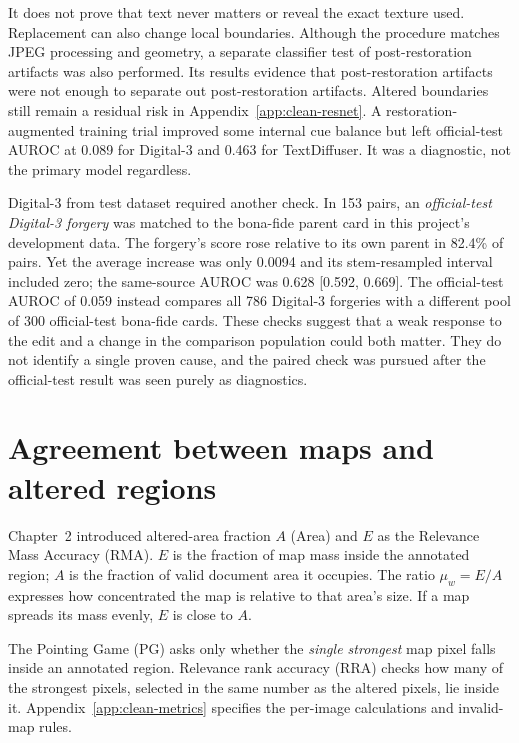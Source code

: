 It does not prove that text never matters or reveal the exact texture used. Replacement can also change local boundaries. Although the procedure matches JPEG processing and geometry, a separate classifier test of post-restoration artifacts was also performed. Its results evidence that post-restoration artifacts were not enough to separate out post-restoration artifacts.
Altered boundaries still remain a residual risk in Appendix~\ref{app:clean-resnet}. A restoration-augmented training trial improved some internal cue balance but left official-test AUROC at 0.089 for Digital-3 and 0.463 for TextDiffuser. It was a diagnostic, not the primary model regardless.

Digital-3 from test dataset required another check. In 153 pairs, an \emph{official-test Digital-3 forgery} was matched to the bona-fide parent card in this project's development data. The forgery's score rose relative to its own parent in 82.4\% of pairs. Yet the average increase was only 0.0094 and its stem-resampled interval included zero; the same-source AUROC was 0.628 [0.592, 0.669]. The official-test AUROC of 0.059 instead compares all 786 Digital-3 forgeries with a different pool of 300 official-test bona-fide cards. These checks suggest that a weak response to the edit and a change in the comparison population could both matter. They do not identify a single proven cause, and the paired check was pursued after the official-test result was seen purely as diagnostics.

\section{Agreement between maps and altered regions}
\label{sec:clean-spatial}

Chapter~2 introduced altered-area fraction $A$ (Area) and $E$ as the Relevance Mass Accuracy (RMA). $E$ is the fraction of map mass inside the annotated region; $A$ is the fraction of valid document area it occupies. The ratio $\mu_w=E/A$ expresses how concentrated the map is relative to that area's size. If a map spreads its mass evenly, $E$ is close to $A$. 

The Pointing Game (PG) asks only whether the \emph{single strongest} map pixel falls inside an annotated region. Relevance rank accuracy (RRA) checks how many of the strongest pixels, selected in the same number as the altered pixels, lie inside it. Appendix~\ref{app:clean-metrics} specifies the per-image calculations and invalid-map rules.

